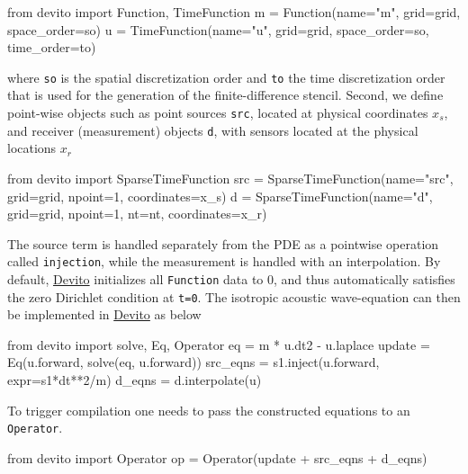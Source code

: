 \documentclass[conference]{IEEEtran}
\begin{document}
\begin{python}
from devito import Function, TimeFunction
m = Function(name="m", grid=grid,
             space_order=so)
u = TimeFunction(name="u", grid=grid,
                 space_order=so,
                 time_order=to)
\end{python}

where \texttt{so} is the spatial discretization order and \texttt{to}
the time discretization order that is used for the generation of the
finite-difference stencil. Second, we define point-wise objects such as
point sources \texttt{src}, located at physical coordinates $x_s$, and
receiver (measurement) objects \texttt{d}, with sensors located at the
physical locations $x_r$

\begin{python}
from devito import SparseTimeFunction
src = SparseTimeFunction(name="src", grid=grid,
                         npoint=1,
                         coordinates=x_s)
d = SparseTimeFunction(name="d", grid=grid,
                       npoint=1, nt=nt,
                       coordinates=x_r)
\end{python}

The source term is handled separately from the PDE as a pointwise
operation called \texttt{injection}, while the measurement is handled
with an interpolation. By default,
\href{https://github.com/devitocodes/devito}{Devito} initializes all
\texttt{Function} data to 0, and thus automatically satisfies the zero
Dirichlet condition at \texttt{t=0}. The isotropic acoustic
wave-equation can then be implemented in
\href{https://github.com/devitocodes/devito}{Devito} as below

\begin{python}
from devito import solve, Eq, Operator
eq = m * u.dt2 - u.laplace
update = Eq(u.forward, solve(eq, u.forward))
src_eqns = s1.inject(u.forward, expr=s1*dt**2/m)
d_eqns = d.interpolate(u)
\end{python}

To trigger compilation one needs to pass the constructed equations to an
\texttt{Operator}.

\begin{python}
from devito import Operator
op = Operator(update + src_eqns + d_eqns)
\end{python}
\end{document}
